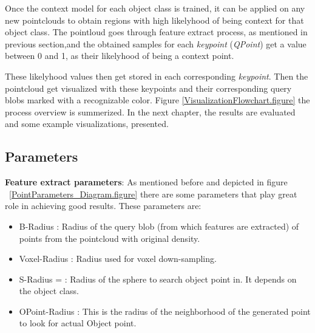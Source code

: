 Once the context model for each object class is trained, it can be applied on any new pointclouds to obtain regions with high likelyhood of being context for that object class. The pointloud goes through feature extract process, as mentioned in previous section,and the obtained samples for each {\it keypoint} ({\it QPoint}) get a value between 0 and 1, as their likelyhood of being a context point. 


These likelyhood values then get stored in each corresponding {\it keypoint}. Then the pointcloud get visualized with these keypoints and their corresponding query blobs marked with a recognizable color. Figure \ref{VisualizationFlowchart.figure} the process overview is summerized. 
In the next chapter, the results are evaluated and some example visualizations, presented.


\subsection{Parameters}
\label{Parameters.ssec}

{\bf Feature extract parameters}:
As mentioned before and depicted in figure ~\ref{PointParameters_Diagram.figure} there are some parameters that play great role in
achieving good results. 
These parameters are:

\begin{itemize}
 \item  B-Radius : Radius of the query blob (from which features are extracted) of points from the pointcloud with original
 density.
 \item Voxel-Radius : Radius used for voxel down-sampling. 
 \item S-Radius = : Radius of the sphere to search object point in. 
 It depends on the object class.
 \item OPoint-Radius : This is the radius of the neighborhood of the generated point to look for actual Object point.
\end{itemize}

